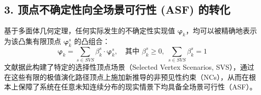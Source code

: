\documentclass[11pt]{ctexart}
\begin{document}
\subsection{3. 顶点不确定性向全场景可行性 (ASF) 的转化}
基于多面体几何定理，任何实际发生的不确定性实现值 $\bm{\varphi}_{k}$，均可以被精确地表示为该凸集有限顶点 $\bm{\varphi}_{k}^{s}$ 的凸组合：
\begin{equation}
\bm{\varphi}_{k} = \sum_{s \in SVS} \beta_k^s \cdot \bm{\varphi}_{k}^{s}, \quad \text{其中 } \beta_k^s \ge 0, \; \sum_{s \in SVS} \beta_k^s = 1
\end{equation}
文献据此构建了特定的选择性顶点场景（Selected Vertex Scenarios, SVS），通过在这些有限的极值演化路径顶点上施加新推导的非预见性约束（NCs），从而在根本上保障了系统在任意未知连续分布的现实情景下均具备全场景可行性（ASF）。
\end{document}

